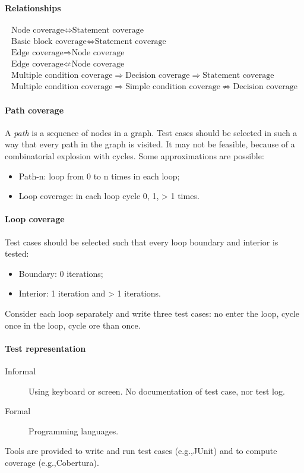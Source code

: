 \paragraph{Relationships}
\begin{gather*}
\text{Node coverage} \Leftrightarrow \text{Statement coverage} \\
\text{Basic block coverage} \Leftrightarrow \text{Statement coverage} \\
\text{Edge coverage} \Rightarrow \text{Node coverage} \\
\text{Edge coverage} \nLeftarrow \text{Node coverage} \\
\text{Multiple condition coverage} \Rightarrow \text{Decision coverage} \Rightarrow \text{Statement coverage} \\
\text{Multiple condition coverage} \Rightarrow \text{Simple condition coverage} \nRightarrow \text{Decision coverage}
\end{gather*}

\paragraph{Path coverage}
A \emph{path} is a sequence of nodes in a graph. Test cases should be selected in such a way that every path in the graph is visited. It may not be feasible, because of a combinatorial explosion with cycles. Some approximations are possible:
\begin{itemize}
\item Path-n: loop from 0 to n times in each loop;
\item Loop coverage: in each loop cycle 0, 1, > 1 times.
\end{itemize}

\paragraph{Loop coverage}
Test cases should be selected such that every loop boundary and interior is tested:
\begin{itemize}
\item Boundary: 0 iterations;
\item Interior: 1 iteration and > 1 iterations.
\end{itemize}
Consider each loop separately and write three test cases: no enter the loop, cycle once in the loop, cycle ore than once.

\paragraph{Test representation}
\begin{description}
\item [Informal] Using keyboard or screen. No documentation of test case, nor test log.
\item [Formal] Programming languages.
\end{description}
Tools are provided to write and run test cases (e.g.,\@ JUnit) and to compute coverage (e.g.,\@ Cobertura).

